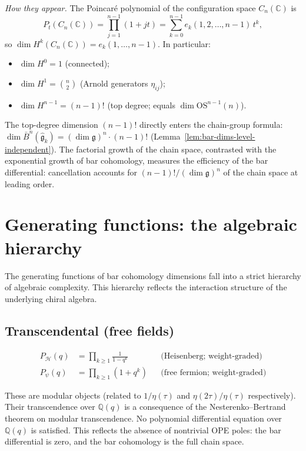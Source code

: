 \emph{How they appear.}
The Poincar\'e polynomial of the configuration space $C_n(\mathbb{C})$ is
\[
P_t(C_n(\mathbb{C})) = \prod_{j=1}^{n-1}(1+jt)
= \sum_{k=0}^{n-1} e_k(1, 2, \ldots, n-1)\, t^k,
\]
so $\dim H^k(C_n(\mathbb{C})) = e_k(1, \ldots, n-1)$.  In particular:
\begin{itemize}
\item $\dim H^0 = 1$ (connected);
\item $\dim H^1 = \binom{n}{2}$ (Arnold generators $\eta_{ij}$);
\item $\dim H^{n-1} = (n-1)!$ (top degree; equals $\dim\mathrm{OS}^{n-1}(n)$).
\end{itemize}
The top-degree dimension $(n-1)!$ directly enters the chain-group formula: $\dim\bar{B}^n(\widehat{\mathfrak{g}}_k) = (\dim\mathfrak{g})^n \cdot (n-1)!$ (Lemma~\ref{lem:bar-dims-level-independent}).  The factorial growth of the chain space, contrasted with the exponential growth of bar cohomology, measures the efficiency of the bar differential: cancellation accounts for $(n-1)!/(\dim\mathfrak{g})^n$ of the chain space at leading order.


\section{Generating functions: the algebraic hierarchy}
\label{sec:gf-hierarchy}

The generating functions of bar cohomology dimensions fall into a strict hierarchy of algebraic complexity.  This hierarchy reflects the interaction structure of the underlying chiral algebra.

\subsection{Transcendental (free fields)}
\label{subsec:gf-transcendental}

\begin{align}
P_{\mathcal{H}}(q) &= \prod_{k \geq 1} \frac{1}{1-q^k}
&&\text{(Heisenberg; weight-graded)} \\
P_{\psi}(q) &= \prod_{k \geq 1} (1+q^k)
&&\text{(free fermion; weight-graded)}
\end{align}

These are modular objects (related to $1/\eta(\tau)$ and $\eta(2\tau)/\eta(\tau)$ respectively).  Their transcendence over $\mathbb{Q}(q)$ is a consequence of the Nesterenko--Bertrand theorem on modular transcendence.  No polynomial differential equation over $\mathbb{Q}(q)$ is satisfied.  This reflects the absence of nontrivial OPE poles: the bar differential is zero, and the bar cohomology is the full chain space.

